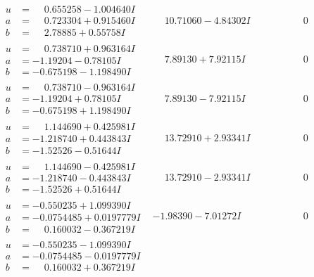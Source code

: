 \documentclass[1p]{elsarticle_modified}
\theoremstyle{definition}
\begin{document}
$$\begin{array}{c|c|c}
\begin{aligned}
u &= \phantom{-}0.655258 - 1.004640 I \\
a &= \phantom{-}0.723304 + 0.915460 I \\
b &= \phantom{-}2.78885 + 0.55758 I\end{aligned}
 & \phantom{-}10.71060 - 4.84302 I & \phantom{-0.000000 } 0 \\ \hline\begin{aligned}
u &= \phantom{-}0.738710 + 0.963164 I \\
a &= -1.19204 - 0.78105 I \\
b &= -0.675198 - 1.198490 I\end{aligned}
 & \phantom{-}7.89130 + 7.92115 I & \phantom{-0.000000 } 0 \\ \hline\begin{aligned}
u &= \phantom{-}0.738710 - 0.963164 I \\
a &= -1.19204 + 0.78105 I \\
b &= -0.675198 + 1.198490 I\end{aligned}
 & \phantom{-}7.89130 - 7.92115 I & \phantom{-0.000000 } 0 \\ \hline\begin{aligned}
u &= \phantom{-}1.144690 + 0.425981 I \\
a &= -1.218740 + 0.443843 I \\
b &= -1.52526 - 0.51644 I\end{aligned}
 & \phantom{-}13.72910 + 2.93341 I & \phantom{-0.000000 } 0 \\ \hline\begin{aligned}
u &= \phantom{-}1.144690 - 0.425981 I \\
a &= -1.218740 - 0.443843 I \\
b &= -1.52526 + 0.51644 I\end{aligned}
 & \phantom{-}13.72910 - 2.93341 I & \phantom{-0.000000 } 0 \\ \hline\begin{aligned}
u &= -0.550235 + 1.099390 I \\
a &= -0.0754485 + 0.0197779 I \\
b &= \phantom{-}0.160032 - 0.367219 I\end{aligned}
 & -1.98390 - 7.01272 I & \phantom{-0.000000 } 0 \\ \hline\begin{aligned}
u &= -0.550235 - 1.099390 I \\
a &= -0.0754485 - 0.0197779 I \\
b &= \phantom{-}0.160032 + 0.367219 I\end{aligned}

\end{array}$$
\end{document}
